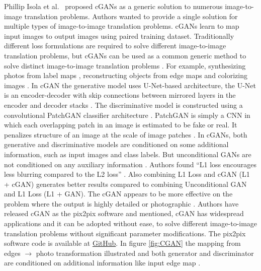 Phillip Isola et al.\ \cite{isola2018imagetoimage} proposed \acp{cGAN} as a generic solution to numerous image-to-image translation problems. Authors wanted to provide a single solution for multiple types of image-to-image translation problems. \acp{cGAN} learn to map input images to output images using paired training dataset. Traditionally different loss formulations are required to solve different image-to-image translation problems, but \acp{cGAN} can be used as a common generic method to solve distinct image-to-image translation problems \cite{isola2018imagetoimage}. For example, synthesizing photos from label maps \cite{cordts2016cityscapes}, reconstructing objects from edge maps \cite{zhu2018generative} \cite{6909426} and colorizing images \cite{wesley2021colorizing}. In \ac{cGAN} the generative model uses U-Net-based architecture, the U-Net is an encoder-decoder with skip connections between mirrored layers in the encoder and decoder stacks \cite{ronneberger2015unet}. The discriminative model is constructed using a convolutional PatchGAN classifier architecture \cite{demir2018patchbased}. PatchGAN is simply a \ac{CNN} in which each overlapping patch in an image is estimated to be fake or real. It penalizes structure of an image at the scale of image patches \cite{li2016precomputed}. In \acp{cGAN}, both generative and discriminative models are conditioned on some additional information, such as input images and class labels. But unconditional \acp{GAN} are not conditioned on any auxiliary information \cite{isola2018imagetoimage}. Authors found ``L1 loss encourages less blurring compared to the L2 loss'' \cite{isola2018imagetoimage}. Also combining L1 Loss and \ac{cGAN} (L1 + \ac{cGAN}) generates better results compared to combining Unconditional \ac{GAN} and L1 Loss (L1 + \ac{GAN}). The \ac{cGAN} appears to be more effective on the problem where the output is highly detailed or photographic \cite{isola2018imagetoimage}. Authors have released \ac{cGAN} as the pix2pix software and mentioned, \ac{cGAN} has widespread applications and it can be adopted without ease, to solve different image-to-image translation problems without significant parameter modifications. The pix2pix software code is available at \href{https://github.com/phillipi/pix2pix.}{GitHub}. In figure \ref{fig:CGAN} the mapping from edges $\rightarrow$ photo transformation illustrated and both generator and discriminator are conditioned on additional information like input edge map \cite{isola2018imagetoimage}.


